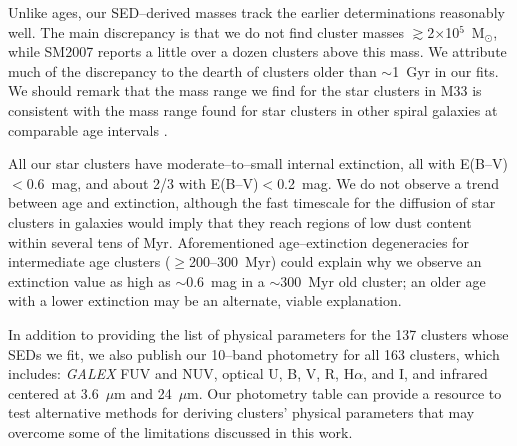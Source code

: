 \documentclass{aastex63}
\begin{document}
Unlike ages, our SED--derived masses track the earlier determinations reasonably well. The main discrepancy is that we do not find cluster masses $\gtrsim$2$\times$10$^5$~M$_{\odot}$, while SM2007 reports a little over a dozen clusters above this mass. We attribute much of the discrepancy to the dearth of clusters older than $\sim$1~Gyr in our fits. We should remark that the mass range we find for the star clusters in M33 is consistent with the mass range found for star clusters in other spiral galaxies at comparable age intervals \citep{Adamo+2018}. 

All our star clusters have moderate--to--small internal extinction, all with E(B--V)$<$0.6~mag, and about 2/3 with E(B--V)$<$0.2~mag. We do not observe a trend between age and extinction, although the fast timescale for the diffusion of star clusters in galaxies \citep{grasha2017a, grasha2017b} would imply that they reach regions of low dust content within several  tens of Myr. Aforementioned age--extinction degeneracies for intermediate age clusters ($\ge$200--300~Myr) could explain why we observe an extinction value as high as $\sim$0.6~mag in a $\sim$300~Myr old cluster; an older age with a lower extinction may be an alternate, viable explanation.  

In addition to providing the list of physical parameters for the 137 clusters whose SEDs  we fit, we also publish our  10--band photometry for all 163 clusters, which includes: \textit{GALEX} FUV and NUV, optical U, B, V, R, H$\alpha$, and I, and infrared centered at 3.6~$\mu$m and 24~$\mu$m. Our photometry table can provide a resource to test alternative methods for deriving clusters' physical parameters that may overcome some of the limitations discussed in this work.


\appendix
\end{document}
